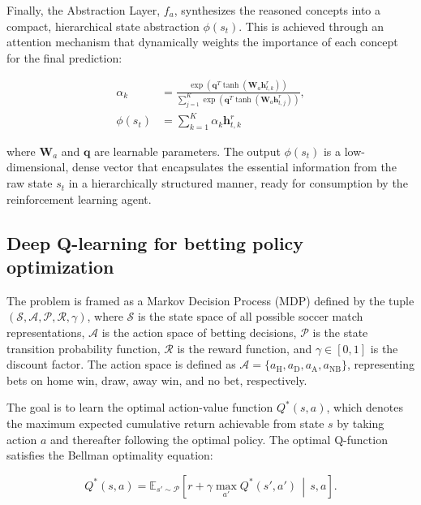 \documentclass[3p,times,procedia]{elsarticle}
\begin{document}
Finally, the Abstraction Layer, $f_a$, synthesizes the reasoned concepts into a compact, hierarchical state abstraction $\phi(s_t)$. This is achieved through an attention mechanism \cite{vaswani2017attention} that dynamically weights the importance of each concept for the final prediction:

\begin{align}
\alpha_k &= \frac{\exp\!\left(\mathbf{q}^T \tanh(\mathbf{W}_a \mathbf{h}_{t,k}^r)\right)}%
{\sum_{j=1}^K \exp\!\left(\mathbf{q}^T \tanh(\mathbf{W}_a \mathbf{h}_{t,j}^r)\right)}, \label{eq:alpha} \\
\phi(s_t) &= \sum_{k=1}^K \alpha_k \mathbf{h}_{t,k}^r \label{eq:phi}
\end{align}

\noindent
where $\mathbf{W}_a$ and $\mathbf{q}$ are learnable parameters. The output $\phi(s_t)$ is a low-dimensional, dense vector that encapsulates the essential information from the raw state $s_t$ in a hierarchically structured manner, ready for consumption by the reinforcement learning agent.

\subsection{Deep Q-learning for betting policy optimization}

The problem is framed as a Markov Decision Process (MDP) defined by the tuple $(\mathcal{S}, \mathcal{A}, \mathcal{P}, \mathcal{R}, \gamma)$, where $\mathcal{S}$ is the state space of all possible soccer match representations, $\mathcal{A}$ is the action space of betting decisions, $\mathcal{P}$ is the state transition probability function, $\mathcal{R}$ is the reward function, and $\gamma \in [0, 1]$ is the discount factor. The action space is defined as $\mathcal{A} = \{a_{\text{H}}, a_{\text{D}}, a_{\text{A}}, a_{\text{NB}}\}$, representing bets on home win, draw, away win, and no bet, respectively.

The goal is to learn the optimal action-value function $Q^*(s, a)$, which denotes the maximum expected cumulative return achievable from state $s$ by taking action $a$ and thereafter following the optimal policy. The optimal Q-function satisfies the Bellman optimality equation:

\begin{equation}\label{eq:bellman}
Q^*(s, a) = \mathbb{E}_{s' \sim \mathcal{P}} \left[ r + \gamma \max_{a'} Q^*(s', a') \,\middle|\, s, a \right].
\end{equation}
\end{document}
